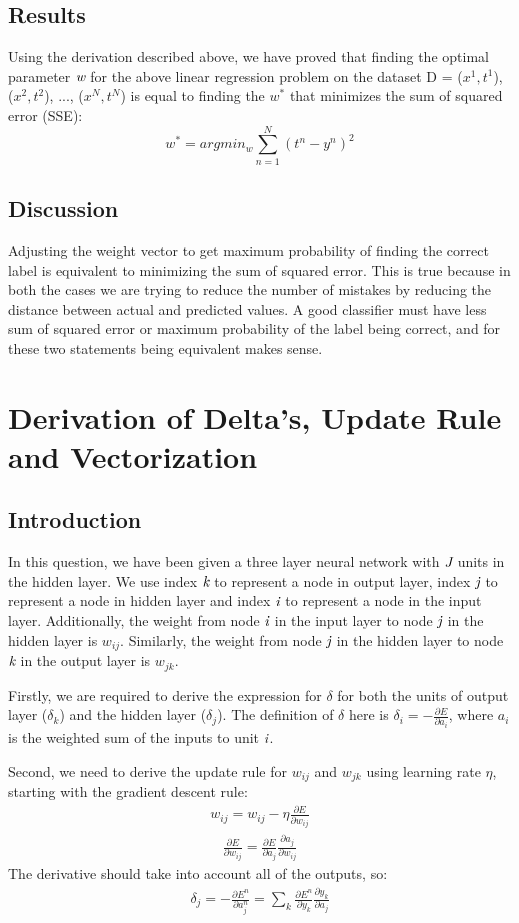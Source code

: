 \documentclass{article}
\begin{document}
\subsection{Results}
Using the derivation described above, we have proved that finding the optimal parameter $\emph{w}$ for the above linear regression problem on the dataset D = {($x^1, t^1$), ($x^2, t^2$), ..., ($x^N, t^N$)} is equal to finding the $w^*$ that minimizes the sum of squared error (SSE):
$$
w^* = argmin_w \sum_{n=1}^N(t^n - y^n)^2 
$$
\subsection{Discussion}
Adjusting the weight vector to get maximum probability of finding the correct label is equivalent to minimizing the sum of squared error. This is true because in both the cases we are trying to reduce the number of mistakes by reducing the distance between actual and predicted values. A good classifier must have less sum of squared error or maximum probability of the label being correct, and for these two statements being equivalent makes sense. 
\newpage

\section{Derivation of Delta's, Update Rule and Vectorization}
\subsection{Introduction}
In this question, we have been given a three layer neural network with $\emph{J}$ units in the hidden layer. We use index $\emph{k}$ to represent a node in output layer, index $\emph{j}$ to represent a node in hidden layer and index $\emph{i}$ to represent a node in the input layer. Additionally, the weight from node $\emph{i}$ in the input layer
to node $\emph{j}$ in the hidden layer is $w_{ij}$. Similarly, the weight from node $\emph{j}$ in the hidden layer to node $\emph{k}$ in the
output layer is $w_{jk}$. 

Firstly, we are required to derive the expression for $\delta$ for both the units of output layer ($\delta_k$) and the hidden layer ($\delta_j$). The definition of $\delta$ here is $\delta_i = - \frac{\partial E}{\partial a_i}$, where $a_i$ is the weighted sum of the inputs to unit $\emph{i}$.

Second, we need to derive the update rule for $w_{ij}$ and $w_{jk}$ using learning rate $\eta$, starting with the gradient descent rule:
\begin{align}
w_{ij} = w_{ij} - \eta \frac{\partial E}{\partial w_{ij}}
\end{align}
\begin{align}
\frac{\partial E}{\partial w_{ij}} = \frac{\partial E}{\partial a_{j}} \frac{\partial a_j}{\partial w_{ij}}
\end{align}
The derivative should take into account all of the outputs, so:
\begin{align}
\delta_j = - \frac{\partial E^n}{\partial a_{j}^n} = \sum_{k} \frac{\partial E^n}{\partial y_{k}} \frac{\partial y_{k}}{\partial a_{j}}
\end{align}
\end{document}
